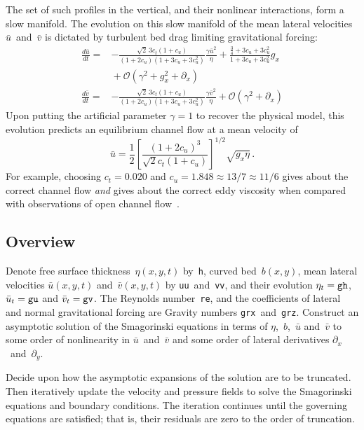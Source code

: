 \documentclass[12pt,a5paper]{article}
\newcommand{\uu}{{\bar u}}
\newcommand{\vv}{{\bar v}}
\begin{document}
The set of such profiles in the vertical, and their nonlinear interactions, form a slow manifold.
The evolution on this slow manifold of the mean lateral velocities $\uu$~and~$\vv$ is dictated by turbulent bed drag limiting gravitational forcing:  
\begin{align}
\frac{d\uu}{dt}=& { 
-\frac{\sqrt2\,3c_t(1+c_u)}{(1+2c_u)(1+3c_u+3c_u^2)} }
\frac{\gamma \uu^2}\eta
+\frac{\frac{3}{4}+3c_u+3c_u^2}{1+3c_u+3c_u^2}g_x
\nonumber\\&{}
+\mathcal O(\gamma^2+g_x^2+\partial_x)
\label{eq:gux}\\
\frac{d\vv}{dt}=& { 
-\frac{\sqrt2\,3c_t(1+c_u)}{(1+2c_u)(1+3c_u+3c_u^2)} }
\frac{\gamma \vv^2}\eta+\mathcal O(\gamma^2+\partial_x)
\label{eq:gvx}
\end{align}
Upon putting the artificial parameter $\gamma=1$ to recover the physical model, this evolution predicts an equilibrium channel flow at a mean velocity of
\begin{equation}
\uu=\frac12\left[ \frac{(1+2c_u)^3}
{\sqrt2c_t(1+c_u)} \right]^{1/2}\sqrt{g_x\eta} \,.
\end{equation}
For example, choosing $c_t=0.020$ and $c_u=1.848\approx 13/7\approx 11/6$ gives about the correct channel flow \emph{and} gives about the correct eddy viscosity when compared with observations of open channel flow~\cite[e.g.]{Nezu05}.



\subsection{Overview}

Denote free surface thickness~$\eta(x,y,t)$ by~\verb|h|, curved bed~$b(x,y)$, mean lateral velocities $\uu(x,y,t)$ and~$\vv(x,y,t)$ by \verb|uu|~and~\verb|vv|, and their
evolution $\eta_t=\verb|gh|$, $\uu_t=\verb|gu|$ and  $\vv_t=\verb|gv|$.  The Reynolds
number~\verb|re|, and the coefficients of lateral and normal
gravitational forcing are Gravity numbers \verb|grx|~and~\verb|grz|.  Construct an
asymptotic solution of the Smagorinski equations in terms of
$\eta$,~$b$,~$\uu$ and~$\vv$ to some order of nonlinearity in $\uu$~and~$\vv$ and some order
of lateral derivatives $\partial_x$~and~$\partial_y$.

Decide upon how the asymptotic expansions of the solution are to be
truncated.  Then iteratively update the velocity and pressure fields to
solve the Smagorinski equations and boundary conditions.  The
iteration continues until the governing equations are satisfied; that is, their
residuals are zero to the order of truncation.
\end{document}
